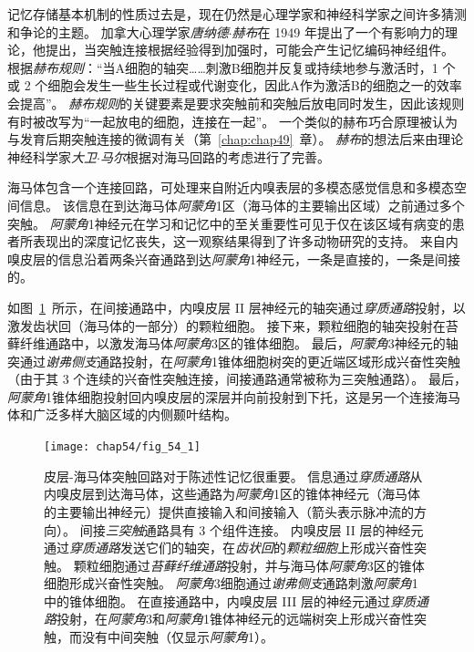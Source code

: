 记忆存储基本机制的性质过去是，现在仍然是心理学家和神经科学家之间许多猜测和争论的主题。
加拿大心理学家\textit{唐纳德$\cdot$赫布}在 1949 年提出了一个有影响力的理论，他提出，当突触连接根据经验得到加强时，可能会产生记忆编码神经组件。
根据\textit{赫布规则}：“当A细胞的轴突……刺激B细胞并反复或持续地参与激活时，1 个或 2 个细胞会发生一些生长过程或代谢变化，因此A作为激活B的细胞之一的效率会提高”。
\textit{赫布规则}的关键要素是要求突触前和突触后放电同时发生，因此该规则有时被改写为“一起放电的细胞，连接在一起”。
一个类似的赫布巧合原理被认为与发育后期突触连接的微调有关（第~\ref{chap:chap49}~章）。
\textit{赫布}的想法后来由理论神经科学家\textit{大卫$\cdot$马尔}根据对海马回路的考虑进行了完善。


海马体包含一个连接回路，可处理来自附近内嗅表层的多模态感觉信息和多模态空间信息。
该信息在到达海马体\textit{阿蒙角}1区（海马体的主要输出区域）之前通过多个突触。
\textit{阿蒙角}1神经元在学习和记忆中的至关重要性可见于仅在该区域有病变的患者所表现出的深度记忆丧失，这一观察结果得到了许多动物研究的支持。
来自内嗅皮层的信息沿着两条兴奋通路到达\textit{阿蒙角}1神经元，一条是直接的，一条是间接的。


如图~\ref{fig:54_1}~所示，在间接通路中，内嗅皮层 II 层神经元的轴突通过\textit{穿质通路}投射，以激发齿状回（海马体的一部分）的颗粒细胞。
接下来，颗粒细胞的轴突投射在苔藓纤维通路中，以激发海马体\textit{阿蒙角}3区的锥体细胞。
最后，\textit{阿蒙角}3神经元的轴突通过\textit{谢弗侧支}通路投射，在\textit{阿蒙角}1锥体细胞树突的更近端区域形成兴奋性突触（由于其 3 个连续的兴奋性突触连接，间接通路通常被称为三突触通路）。
最后，\textit{阿蒙角}1锥体细胞投射回内嗅皮层的深层并向前投射到下托，这是另一个连接海马体和广泛多样大脑区域的内侧颞叶结构。


\begin{figure}[htbp]
	\centering
	\texttt{[image: chap54/fig\_54\_1]}
	\caption{皮层-海马体突触回路对于陈述性记忆很重要。
		信息通过\textit{穿质通路}从内嗅皮层到达海马体，这些通路为\textit{阿蒙角}1区的锥体神经元（海马体的主要输出神经元）提供直接输入和间接输入（箭头表示脉冲流的方向）。
		间接\textit{三突触}通路具有 3 个组件连接。
		内嗅皮层 II 层的神经元通过\textit{穿质通路}发送它们的轴突，在\textit{齿状回}的\textit{颗粒细胞}上形成兴奋性突触。
		颗粒细胞通过\textit{苔藓纤维通路}投射，并与海马体\textit{阿蒙角}3区的锥体细胞形成兴奋性突触。
		\textit{阿蒙角}3细胞通过\textit{谢弗侧支}通路刺激\textit{阿蒙角}1中的锥体细胞。
		在直接通路中，内嗅皮层 III 层的神经元通过\textit{穿质通路}投射，在\textit{阿蒙角}3和\textit{阿蒙角}1锥体神经元的远端树突上形成兴奋性突触，而没有中间突触（仅显示\textit{阿蒙角}1）。}
	\label{fig:54_1}
\end{figure}


